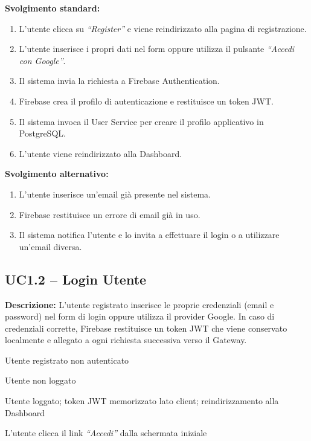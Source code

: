 \documentclass[12pt,a4paper,twoside]{report}
\newenvironment{ucbox}{%
  \begin{mdframed}[
    backgroundcolor=ucbg,
    linecolor=ucborder,
    linewidth=1pt,
    innerleftmargin=10pt,
    innerrightmargin=10pt,
    innertopmargin=8pt,
    innerbottommargin=8pt,
    roundcorner=4pt
  ]
}{%
  \end{mdframed}
}
\begin{document}
\textbf{Svolgimento standard:}
\begin{enumerate}
  \item L'utente clicca su \textit{``Register''} e viene reindirizzato alla pagina di registrazione.
  \item L'utente inserisce i propri dati nel form oppure utilizza il pulsante \textit{``Accedi con Google''}.
  \item Il sistema invia la richiesta a Firebase Authentication.
  \item Firebase crea il profilo di autenticazione e restituisce un token JWT.
  \item Il sistema invoca il User Service per creare il profilo applicativo in PostgreSQL.
  \item L'utente viene reindirizzato alla Dashboard.
\end{enumerate}

\textbf{Svolgimento alternativo:}
\begin{enumerate}
  \item L'utente inserisce un'email già presente nel sistema.
  \item Firebase restituisce un errore di email già in uso.
  \item Il sistema notifica l'utente e lo invita a effettuare il login o a utilizzare un'email diversa.
\end{enumerate}

\newpage
\subsection{UC1.2 -- Login Utente}

\begin{ucbox}
\textbf{Descrizione:} L'utente registrato inserisce le proprie credenziali (email e password) nel form di login oppure utilizza il provider Google. In caso di credenziali corrette, Firebase restituisce un token JWT che viene conservato localmente e allegato a ogni richiesta successiva verso il Gateway.

\begin{description}[leftmargin=4cm, style=sameline]
  \item[Attori Coinvolti:] Utente registrato non autenticato
  \item[Precondizione:] Utente non loggato
  \item[Postcondizione:] Utente loggato; token JWT memorizzato lato client; reindirizzamento alla Dashboard
  \item[Trigger:] L'utente clicca il link \textit{``Accedi''} dalla schermata iniziale
\end{description}
\end{ucbox}
\end{document}
